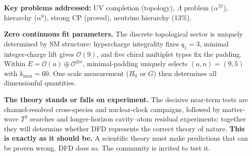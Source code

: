 \begin{tcolorbox}[colback=blue!5!white, colframe=blue!50!black, title=DFD: Unified Framework + Falsifiable Predictions, boxsep=3pt, left=3pt, right=3pt]
\smallskip
\textbf{Key problems addressed:} UV completion (topology), $\Lambda$ problem ($\alpha^{57}$), hierarchy ($\alpha^8$), strong CP (proved), neutrino hierarchy (13\%).

\smallskip
\textbf{Zero continuous fit parameters.} The discrete topological sector is uniquely determined by SM structure: hypercharge integrality fixes $q_1 = 3$, minimal integer-charge lift gives $\mathcal{O}(9)$, and five chiral multiplet types fix the padding. Within $E = \mathcal{O}(a) \oplus \mathcal{O}^{\oplus n}$, minimal-padding uniquely selects $(a,n) = (9,5)$ with $k_{\max} = 60$. One scale measurement ($H_0$ or $G$) then determines all dimensionful quantities.

\smallskip
\textbf{The theory stands or falls on experiment.}
The decisive near-term tests are channel-resolved cross-species and nuclear-clock campaigns, followed by matter-wave $T^3$ searches and longer-horizon cavity--atom residual experiments; together they will determine whether DFD represents the correct theory of nature.
\textbf{This is exactly as it should be.} A scientific theory must make predictions that can be proven wrong. DFD does so. The community is invited to test it.
\end{tcolorbox}
